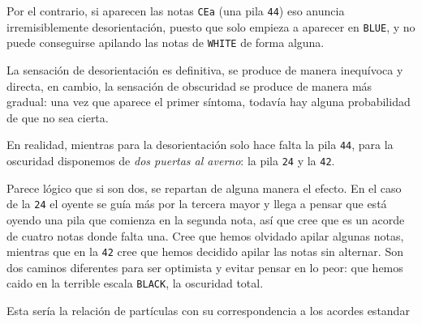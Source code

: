\documentclass[]{article}
\begin{document}
  Por el contrario, si aparecen las notas \texttt{CEa} (una pila \texttt{44}) eso anuncia irremisiblemente desorientación, puesto que solo empieza a aparecer en \texttt{BLUE}, y no puede conseguirse apilando las notas de \texttt{WHITE} de forma alguna.
  
  La sensación de desorientación es definitiva, se produce de manera inequívoca y directa, en cambio, la sensación de obscuridad se produce de manera más gradual: una vez que aparece el primer síntoma, todavía hay alguna probabilidad de que no sea cierta.
  
  En realidad, mientras para la desorientación solo hace falta la pila \texttt{44}, para la oscuridad disponemos de \emph{dos puertas al averno}: la pila \texttt{24} y la \texttt{42}.
  
  Parece lógico que si son dos, se repartan de alguna manera el efecto. En el caso de la \texttt{24} el oyente se guía más por la tercera mayor y llega a pensar que está oyendo una pila que comienza en la segunda nota, así que cree que es un acorde de cuatro notas donde falta una. Cree que hemos olvidado apilar algunas notas, mientras que en la \texttt{42} cree que hemos decidido apilar las notas sin alternar. Son dos caminos diferentes para ser optimista y evitar pensar en lo peor: que hemos caido en la terrible escala \texttt{BLACK}, la oscuridad total.

  Esta sería la relación de partículas con su correspondencia a los acordes estandar

  
\end{document}
